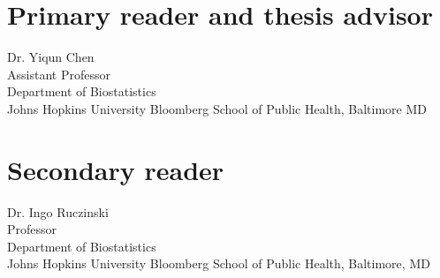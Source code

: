 \begin{singlespace}

    \section*{Primary reader and thesis advisor}
    
    Dr. Yiqun Chen \\
    Assistant Professor\\
    Department of Biostatistics\\
    Johns Hopkins University Bloomberg School of Public Health, Baltimore MD 


    \section*{Secondary reader}
    
    Dr. Ingo Ruczinski\\
    Professor\\
    Department of Biostatistics \\
    Johns Hopkins University Bloomberg School of Public Health, Baltimore, MD 
    

\end{singlespace}

